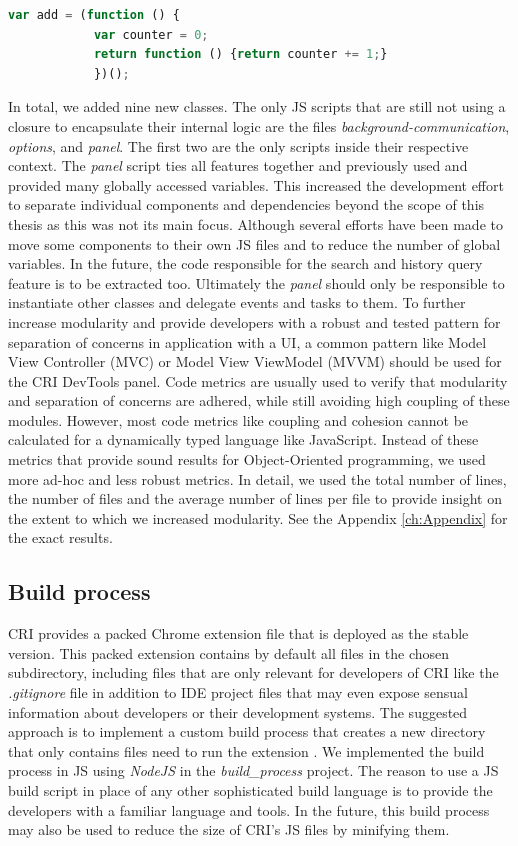 		\begin{lstlisting}[language=JavaScript, caption={Example of RxJS code.},label={lst:closure}]
			var add = (function () {
			var counter = 0;
			return function () {return counter += 1;}
			})();
		\end{lstlisting}
In total, we added nine new classes. The only JS scripts that are still not using a closure to encapsulate their internal logic are the files \emph{background-communication}, \emph{options}, and \emph{panel}. The first two are the only scripts inside their respective context. The \emph{panel} script ties all features together and previously used and provided many globally accessed variables. This increased the development effort to separate individual components and dependencies beyond the scope of this thesis as this was not its main focus. Although several efforts have been made to move some components to their own JS files and to reduce the number of global variables. In the future, the code responsible for the search and history query feature is to be extracted too. Ultimately the \emph{panel} should only be responsible to instantiate other classes and delegate events and tasks to them. To further increase modularity and provide developers with a robust and tested pattern for separation of concerns in application with a UI, a common pattern like Model View Controller (MVC) or Model View ViewModel (MVVM) should be used for the CRI DevTools panel.
Code metrics are usually used to verify that modularity and separation of concerns are adhered, while still avoiding high coupling of these modules. However, most code metrics like coupling and cohesion \cite{Coupling} cannot be calculated for a dynamically typed language like JavaScript. Instead of these metrics that provide sound results for Object-Oriented programming, we used more ad-hoc and less robust metrics. In detail, we used the total number of lines, the number of files and the average number of lines per file to provide insight on the extent to which we increased modularity. See the Appendix \ref{ch:Appendix} for the exact results.
	
\subsection{Build process}
CRI provides a packed Chrome extension file that is deployed as the stable version. This packed extension contains by default all files in the chosen subdirectory, including files that are only relevant for developers of CRI like the \emph{.gitignore} file in addition to IDE project files that may even expose sensual information about developers or their development systems. The suggested approach is to implement a custom build process that creates a new directory that only contains files need to run the extension \cite{BuildScript}. We implemented the build process in JS using \emph{NodeJS} \cite{NodeJS} in the \emph{build\_process} project. The reason to use a JS build script in place of any other sophisticated build language is to provide the developers with a familiar language and tools. In the future, this build process may also be used to reduce the size of CRI's JS files by minifying them. 